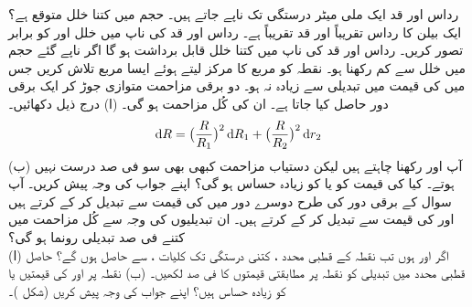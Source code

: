 رداس  اور قد  ایک ملی میٹر درستگی تک ناپے جاتے ہیں۔ حجم  میں کتنا خلل متوقع ہے؟ 
ایک بیلن کا رداس  تقریباً  اور قد تقریباً   ہے۔  رداس اور قد کی ناپ میں خلل  اور  کو  برابر  تصور کریں۔ رداس اور قد کی ناپ میں  کتنا خلل  قابل برداشت ہو گا اگر   ناپے گئے حجم میں خلل  سے کم رکھنا ہو۔ 
نقطہ  کو  مربع  کا مرکز لیتے ہوئے ایسا مربع تلاش کریں جس میں   کی قیمت میں تبدیلی    سے زیادہ  نہ ہو۔
دو برقی مزاحمت متوازی جوڑ کر ایک برقی دور حاصل کیا  جاتا  ہے۔ ان کی کُل مزاحمت  ہو گی۔ (ا) درج ذیل دکھائیں۔
\begin{align*}
\dif R=\big(\frac{R}{R_1}\big)^2\dif R_1+\big(\frac{R}{R_2}\big)^2\dif r_2
\end{align*}
(ب) آپ   اور  رکھنا چاہتے ہیں لیکن   دستیاب مزاحمت کبھی بھی سو فی صد درست  نہیں ہوتے۔ کیا  کی قیمت  کو یا  کو زیادہ حساس ہو گی؟ اپنے جواب کی وجہ پیش کریں۔
آپ سوال  کے برقی دور کی طرح دوسرے دور  میں   کی قیمت   سے تبدیل کر کے  کرتے ہیں  اور   کی قیمت  سے تبدیل کر کے  کرتے ہیں۔ ان تبدیلیوں کی وجہ سے کُل مزاحمت  میں  کتنے فی صد تبدیلی رونما  ہو گی؟
\\
(ا) اگر  اور  ہوں تب  نقطہ  کے قطبی محدد ،  کتنی درستگی  تک   کلیات ،  سے   حاصل ہوں گے؟   حاصل قطبی محدد  میں تبدیلی کو  نقطہ  پر مطابقتی قیمتوں کا فی صد  لکھیں۔ (ب) نقطہ  پر  اور  کی قیمتیں  یا  کو زیادہ حساس ہیں؟ اپنے جواب کی وجہ پیش کریں (شکل )۔ 
